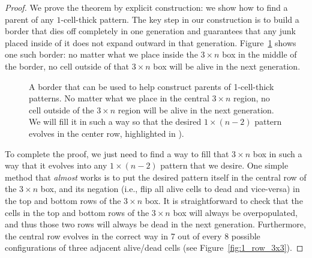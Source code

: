 \begin{proof}
	We prove the theorem by explicit construction: we show how to find a parent of any $1$-cell-thick pattern. The key step in our construction is to build a border that dies off completely in one generation and guarantees that any junk placed inside of it does not expand outward in that generation. Figure~\ref{fig:1_row_border} shows one such border: no matter what we place inside the $3 \times n$ box in the middle of the border, no cell outside of that $3 \times n$ box will be alive in the next generation.
	
	\begin{figure}[!htb]
		\centering{}
		\caption{A border that can be used to help construct parents of 1-cell-thick patterns. No matter what we place in the central $3 \times n$ region, no cell outside of the $3 \times n$ region will be alive in the next generation. We will fill it in such a way so that the desired $1 \times (n-2)$ pattern evolves in the center row, highlighted in ).}\label{fig:1_row_border}
	\end{figure}
	
	To complete the proof, we just need to find a way to fill that $3 \times n$ box in such a way that it evolves into any $1 \times (n-2)$ pattern that we desire. One simple method that \emph{almost} works is to put the desired pattern itself in the central row of the $3 \times n$ box, and its negation (i.e., flip all alive cells to dead and vice-versa) in the top and bottom rows of the $3 \times n$ box. It is straightforward to check that the cells in the top and bottom rows of the $3 \times n$ box will always be overpopulated, and thus those two rows will always be dead in the next generation. Furthermore, the central row evolves in the correct way in 7 out of every 8 possible configurations of three adjacent alive/dead cells (see Figure~\ref{fig:1_row_3x3}).


\end{proof}
